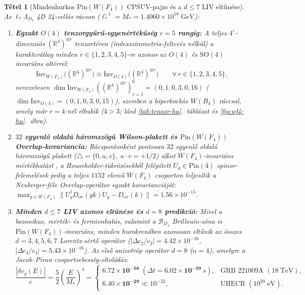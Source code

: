 \documentclass[11pt,a4paper]{article}
\newtheorem{theorem}{Tétel}[section]
\begin{document}
\begin{theorem}[Mindenhurkos $\mathrm{Pin}(W(F_4))$ CPSUV-pajzs és a $d \le 7$ LIV eltűnése]
\label{thm:wf4-shield}
Az $\ell_*\Lambda_{D_4}$ 4D 24-cellás rácson ($\ell_*^{-1} = M_* = 1.4060\times 10^{18}\;\mathrm{GeV}$):
\begin{enumerate}[label=(\roman*),leftmargin=1.9em,itemsep=2pt]
\item \textbf{Egzakt $O(4)$ tenzorgyűrű-egyenértékűség $r = 5$ rangig:} A teljes $4^r$-dimenziós $(\mathbb{R}^4)^{\otimes r}$ tenzortéren (indexszimmetria-feltevés nélkül) a karakterátlag minden $r \in \{1,2,3,4,5\}$-re azonos az $O(4)$ és $\mathrm{SO}(4)$ invariáns altérrel:
\begin{equation}
\mathrm{Inv}_{W(F_4)}\!\bigl((\mathbb{R}^4)^{\otimes r}\bigr) \equiv \mathrm{Inv}_{O(4)}\!\bigl((\mathbb{R}^4)^{\otimes r}\bigr) \qquad \forall\, r \in \{1,2,3,4,5\},
\end{equation}
nevezetesen $\dim\mathrm{Inv}_{W(F_4)}((\mathbb{R}^4)^{\otimes r})_{r=1}^6 = (0, 1, 0, 3, 0, 16)$ ($\dim\mathrm{Inv}_{O(4)} = (0, 1, 0, 3, 0, 15)$), szemben a hiperkockás $W(B_4)$ ráccsal, amely már $r=4$-nél elbukik ($4 > 3$; lásd \ref{tab:tensor-hu}.\ táblázat és \ref{fig:wf4-hu}.\ ábra).
\item \textbf{$32$ egyenlő oldalú háromszögű Wilson-plakett és $\mathrm{Pin}(W(F_4))$ Overlap-kovariancia:} Rácspontonként pontosan $32$ egyenlő oldalú háromszögű plakett ($\triangle = \{0, u, v\}$, $u\cdot v = +1/2$) alkot $W(F_4)$-invariáns mértékhatást \cite{Celmaster1982}, a Householder-tükrözésekből felépített $U_g \in \mathrm{Pin}(4)$ spinor-felemelések pedig a teljes $1152$ elemű $W(F_4)$ csoporton teljesítik a Neuberger-féle Overlap-operátor \cite{Neuberger1998,Luscher1998} egzakt kovarianciáját: $\max_{g\in W(F_4)}\|U_g^\dagger D_{\mathrm{ov}}(gk)U_g - D_{\mathrm{ov}}(k)\| = 1.56\times 10^{-15}$.
\item \textbf{Minden $d \le 7$ LIV azonos eltűnése és $d=8$ predikció:} Mivel a bozonikus, mérték- és fermionhatás, valamint a $\mathcal{B}_{D_4}$ Brillouin-zóna is $\mathrm{Pin}(W(F_4))$-invariáns, minden hurokrendben azonosan eltűnik az összes $d=3,4,5,6,7$ Lorentz-sértő operátor ($|\Delta c_2/c_2| = 4.42\times 10^{-16}$, $|\Delta c_4/c_4| = 5.43\times 10^{-16}$). Az első anizotróp operátor $d=8$ ($n=4$), amelyre a Jacob--Piran \cite{JacobPiran2008} csoportsebesség-eltolódás:
\begin{equation}
\frac{|\delta v_g(E)|}{c} = \frac{5}{2}\left(\frac{E}{M_*}\right)^{\!4} =
\begin{cases}
\mathbf{6.72\times 10^{-56}} \;(\Delta t = \mathbf{6.02\times 10^{-39}\;\mathrm{s}}), & \text{GRB~221009A } (18\;\mathrm{TeV}), \\[3pt]
\mathbf{6.40\times 10^{-29}} \ll 10^{-22}, & \text{UHECR } (10^{20}\;\mathrm{eV}).
\end{cases}
\end{equation}
\end{enumerate}
\end{theorem}
\end{document}
